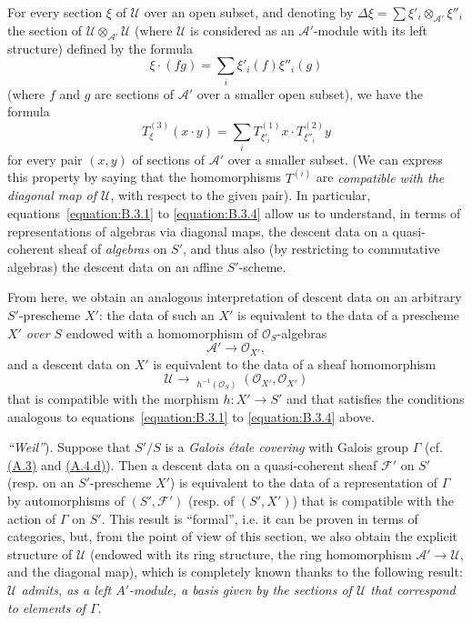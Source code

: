 \documentclass{article}
\theoremstyle{plain}
\theoremstyle{definition}
\newenvironment{example}[1]
  {\renewcommand\theinnercustomexample{#1}\innercustomexample}
  {\endinnercustomexample}
\newcommand{\sh}[1]{{\mathscr{#1}}}
\DeclareMathOperator{\Hom}{Hom}
\DeclareMathOperator{\shHom}{\underline{\Hom}}
\newcommand{\oldpage}[1]{\marginpar{\footnotesize$\Big\vert$ \textit{p.~#1}}}
\begin{document}
For every section $\xi$ of $\sh{U}$ over an open subset, and denoting by $\Delta\xi=\sum\xi'_i\otimes_{\sh{A}'}\xi''_i$ the section of $\sh{U}\otimes_{\sh{A}'}\sh{U}$ (where $\sh{U}$ is considered as an $\sh{A}'$-module with its left structure) defined by the formula
\[
  \xi\cdot(fg) = \sum_i\xi'_i(f)\xi''_i(g)
\]
(where $f$ and $g$ are sections of $\sh{A}'$ over a smaller open subset), we have the formula
\[
\label{equation:B.3.4}
  T_\xi^{(3)}(x\cdot y) = \sum_i T_{\xi'_i}^{(1)}x\cdot T_{\xi''_i}^{(2)}y
\tag{3.4}
\]
for every pair $(x,y)$ of sections of $\sh{A}'$ over a smaller subset.
(We can express this property by saying that the homomorphisms $T^{(i)}$ are \emph{compatible with the diagonal map of $\sh{U}$}, with respect to the given pair).
In particular, equations~\cref{equation:B.3.1} to \cref{equation:B.3.4} allow us to understand, in terms of representations of algebras via diagonal maps, the descent data on a quasi-coherent sheaf of \emph{algebras} on $S'$, and thus also (by restricting to commutative algebras) the descent data on an affine $S'$-scheme.

From here, we obtain an analogous interpretation of descent data on an arbitrary $S'$-prescheme $X'$:
the data of such an $X'$ is equivalent to the data of a prescheme $X'$ \emph{over $S$} endowed with a homomorphism of $\sh{O}_S$-algebras
\[
  \sh{A}'\to\sh{O}_{X'},
\]
and a descent data on $X'$ is equivalent to the data of a sheaf homomorphism
\[
  \sh{U}
  \to \shHom_{h^{-1}(\sh{O}_S)}(\sh{O}_{X'},\sh{O}_{X'})
\]
that is compatible with the morphism $h\colon X'\to S'$ and that satisfies the conditions analogous to equations~\cref{equation:B.3.1} to \cref{equation:B.3.4} above.

\begin{example}{1}
  (\emph{``Weil''}).
  Suppose that $S'/S$ is a \emph{Galois \'{e}tale covering} with Galois group $\Gamma$ (cf. \hyperref[A.3]{(A.3)} and \hyperref[A.4.d]{(A.4.d)}).
  Then a descent data on a quasi-coherent sheaf $\sh{F}'$ on $S'$ (resp. on an $S'$-prescheme $X'$) is equivalent to the data of a representation of $\Gamma$ by automorphisms of $(S',\sh{F}')$ (resp. of $(S',X')$) that is compatible with the action of $\Gamma$ on $S'$.
  This result
\oldpage{190-23}
  is ``formal'', i.e. it can be proven in terms of categories, but, from the point of view of this section, we also obtain the explicit structure of $\sh{U}$ (endowed with its ring structure, the ring homomorphism $\sh{A}'\to\sh{U}$, and the diagonal map), which is completely known thanks to the following result:
  \emph{$\sh{U}$ admits, as a left $A'$-module, a basis given by the sections of $\sh{U}$ that correspond to elements of $\Gamma$}.
\end{example}
\end{document}
